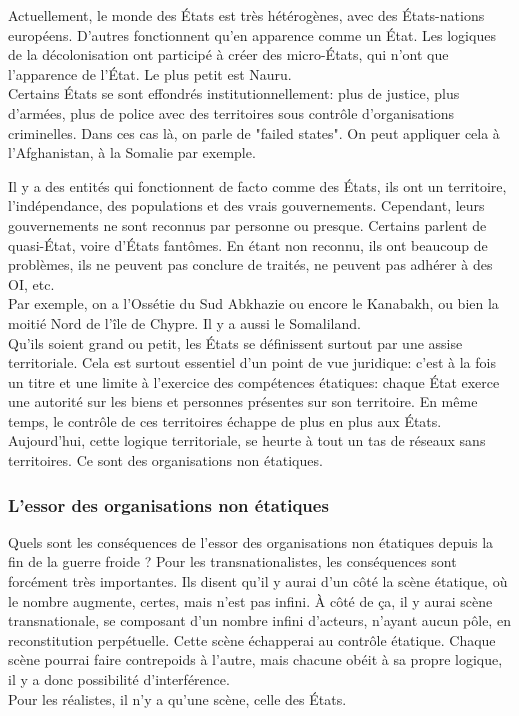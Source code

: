 \documentclass[10pt, a4paper, openany]{book}
\begin{document}
Actuellement, le monde des États est très hétérogènes, avec des États-nations européens. D'autres fonctionnent qu'en apparence comme un État. Les logiques de la décolonisation ont participé à créer des micro-États, qui n'ont que l'apparence de l'État. Le plus petit est Nauru. \\
Certains États se sont effondrés institutionnellement: plus de justice, plus d'armées, plus de police avec des territoires sous contrôle d'organisations criminelles. Dans ces cas là, on parle de "failed states". On peut appliquer cela à l'Afghanistan, à la Somalie par exemple. 


Il y a des entités qui fonctionnent de facto comme des États, ils ont un territoire, l'indépendance, des populations et des vrais gouvernements. Cependant, leurs gouvernements ne sont reconnus par personne ou presque. Certains parlent de quasi-État, voire d'États fantômes. En étant non reconnu, ils ont beaucoup de problèmes, ils ne peuvent pas conclure de traités, ne peuvent pas adhérer à des OI, etc. \\
Par exemple, on a l'Ossétie du Sud Abkhazie ou encore le Kanabakh, ou bien la moitié Nord de l'île de Chypre. Il y a aussi le Somaliland. \\
Qu'ils soient grand ou petit, les États se définissent surtout par une assise territoriale. Cela est surtout essentiel d'un point de vue juridique: c'est à la fois un titre et une limite à l'exercice des compétences étatiques: chaque État exerce une autorité sur les biens et personnes présentes sur son territoire. En même temps, le contrôle de ces territoires échappe de plus en plus aux États. Aujourd'hui, cette logique territoriale, se heurte à tout un tas de réseaux sans territoires. Ce sont des organisations non étatiques. 

\subsubsection{L'essor des organisations non étatiques}

Quels sont les conséquences de l'essor des organisations non étatiques depuis la fin de la guerre froide ? Pour les transnationalistes, les conséquences sont forcément très importantes. Ils disent qu'il y aurai d'un côté la scène étatique, où le nombre augmente, certes, mais n'est pas infini. À côté de ça, il y aurai scène transnationale, se composant d'un nombre infini d'acteurs, n'ayant aucun pôle, en reconstitution perpétuelle. Cette scène échapperai au contrôle étatique. Chaque scène pourrai faire contrepoids à l'autre, mais chacune obéit à sa propre logique, il y a donc possibilité d'interférence. \\
Pour les réalistes, il n'y a qu'une scène, celle des États. 
\end{document}
